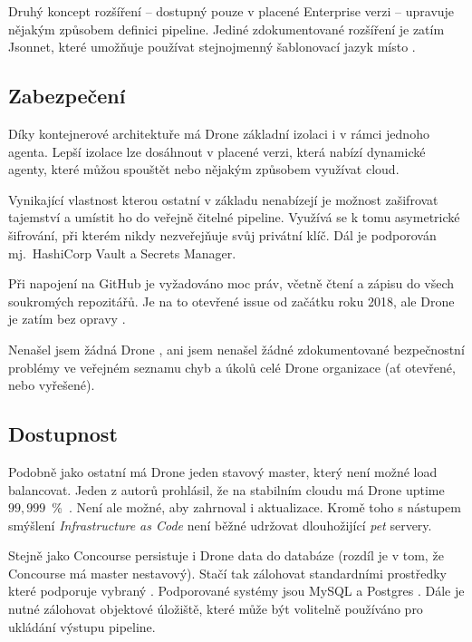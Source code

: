         Druhý koncept rozšíření -- dostupný pouze v placené Enterprise verzi -- upravuje nějakým způsobem definici pipeline. Jediné zdokumentované rozšíření je zatím Jsonnet, které umožňuje používat stejnojmenný šablonovací jazyk místo  \cite{drone-jsonnet}.

    \subsection{Zabezpečení}
        Díky kontejnerové architektuře má Drone základní izolaci i v rámci jednoho agenta. Lepší izolace lze dosáhnout v placené verzi, která nabízí dynamické agenty, které můžou spouštět  nebo nějakým způsobem využívat cloud.

        Vynikající vlastnost kterou ostatní v základu \CI nenabízejí je možnost zašifrovat tajemství a umístit ho do veřejně čitelné pipeline. Využívá se k tomu asymetrické šifrování, při kterém \CI nikdy nezveřejňuje svůj privátní klíč. Dál je podporován mj.~HashiCorp Vault a  Secrets Manager.

        Při napojení na GitHub je vyžadováno moc práv, včetně čtení a zápisu do všech soukromých repozitářů. Je na to otevřené issue od začátku roku 2018, ale Drone je zatím bez opravy \cite{drone-github-acl}.

        Nenašel jsem žádná Drone , ani jsem nenašel žádné zdokumentované bezpečnostní problémy ve veřejném seznamu chyb a úkolů celé Drone organizace (ať otevřené, nebo vyřešené).

    \subsection{Dostupnost}
        Podobně jako ostatní \CI má Drone jeden stavový master, který není možné load balancovat. Jeden z autorů prohlásil, že na stabilním cloudu má Drone uptime $99,999$~\%~\cite{drone-ha}. Není ale možné, aby zahrnoval i aktualizace. Kromě toho s nástupem smýšlení \textit{Infrastructure as Code} není běžné udržovat dlouhožijící \textit{pet} servery.

        Stejně jako Concourse persistuje i Drone data do databáze (rozdíl je v tom, že Concourse má master nestavový). Stačí tak zálohovat standardními prostředky které podporuje vybraný . Podporované systémy jsou MySQL a Postgres \cite{drone-database}. Dále je nutné zálohovat objektové úložiště, které může být volitelně používáno pro ukládání výstupu pipeline.

